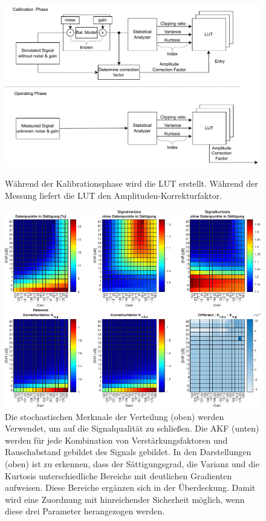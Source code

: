 \begin{figure}[h!]
	\centering
	\includegraphics[width=.85\textwidth]{../img/factor.pdf}
	\caption{Während der Kalibrationsphase wird die LUT erstellt. Während der Messung liefert die LUT den Amplituden-Korrekturfaktor.}
	\label{fig:factor_eval} 
%
	\centering
	\includegraphics[width=.85\textwidth]{../img/lut.pdf}
	\caption{Die stochastischen Merkmale der Verteilung (oben) werden Verwendet, um auf die Signalqualität zu schließen. Die AKF (unten) werden für jede Kombination von Verstärkungsfaktoren und Rauschabstand gebildet des Signals gebildet. In den Darstellungen (oben) ist zu erkennen, dass der Sättigungsgrad, die Varianz und die Kurtosis unterschiedliche Bereiche mit deutlichen Gradienten aufweisen. Diese Bereiche ergänzen sich in der Überdeckung. Damit wird eine Zuordnung mit hinreichender Sicherheit möglich, wenn diese drei Parameter herangezogen werden.}
	\label{fig:lut} 
\end{figure}

